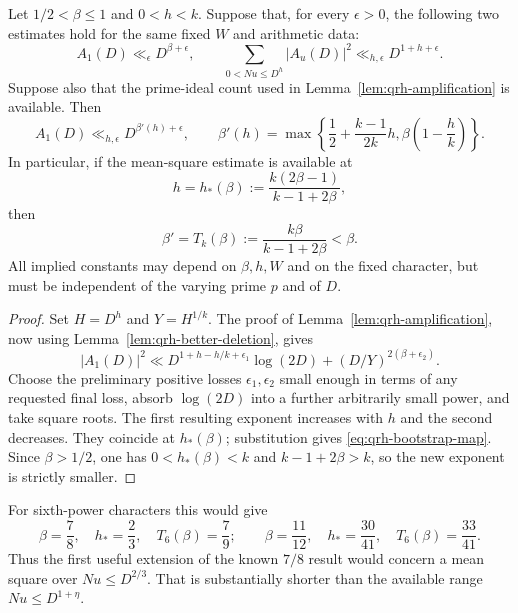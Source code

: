 \begin{proposition}
\label{prop:qrh-exponent-improvement}
Let $1/2<\beta\le1$ and $0<h<k$. Suppose that, for every
$\epsilon>0$, the following two estimates hold for the same
fixed $W$ and arithmetic data:
\[
 A_1(D)\ll_\epsilon D^{\beta+\epsilon},\qquad
 \sum_{0<Nu\le D^h}|A_u(D)|^2
       \ll_{h,\epsilon}D^{1+h+\epsilon}.
\]
Suppose also that the prime-ideal count used in
Lemma~\ref{lem:qrh-amplification} is available. Then
\[
 A_1(D)\ll_{h,\epsilon}D^{\beta'(h)+\epsilon},
 \qquad
 \beta'(h)=\max\left\{
    \frac12+\frac{k-1}{2k}h,
    \beta\left(1-\frac hk\right)\right\}.
\]
In particular, if the mean-square estimate is available at
\[
 h=h_*(\beta):=\frac{k(2\beta-1)}{k-1+2\beta},
\]
then
\begin{equation}\label{eq:qrh-bootstrap-map}
 \beta'=T_k(\beta):=\frac{k\beta}{k-1+2\beta}<\beta.
\end{equation}
All implied constants may depend on $\beta,h,W$ and on the
fixed character, but must be independent of the varying prime
$p$ and of $D$.
\end{proposition}
\begin{proof}
Set $H=D^h$ and $Y=H^{1/k}$. The proof of
Lemma~\ref{lem:qrh-amplification}, now using
Lemma~\ref{lem:qrh-better-deletion}, gives
\[
 |A_1(D)|^2\ll
 D^{1+h-h/k+\epsilon_1}\log(2D)
       +(D/Y)^{2(\beta+\epsilon_2)}.
\]
Choose the preliminary positive losses $\epsilon_1,\epsilon_2$
small enough in terms of any requested final loss, absorb
$\log(2D)$ into a further arbitrarily small power, and take
square roots. The first resulting exponent increases with
$h$ and the second decreases. They coincide at $h_*(\beta)$;
substitution gives \eqref{eq:qrh-bootstrap-map}. Since
$\beta>1/2$, one has $0<h_*(\beta)<k$ and
$k-1+2\beta>k$, so the new exponent is strictly smaller.
\end{proof}

For sixth-power characters this would give
\[
 \beta=\frac78,\quad h_* =\frac23,
       \quad T_6(\beta)=\frac79;
 \qquad
 \beta=\frac{11}{12},\quad h_* =\frac{30}{41},
       \quad T_6(\beta)=\frac{33}{41}.
\]
Thus the first useful extension of the known $7/8$ result
would concern a mean square over $Nu\le D^{2/3}$.
That is substantially shorter than the available range
$Nu\le D^{1+\eta}$.

